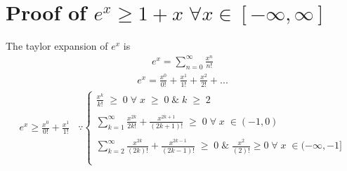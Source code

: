 \documentclass[11pt]{article}
\begin{document}
\section{Proof of $e^x \ge 1 + x \;\forall x \in [-\infty, \infty]$ } \label{appendix: ex}

The taylor expansion of $e^x$ is
\begin{align*}
	e^x = \sum_{n = 0}^{\infty} \frac{x^n}{n!}
\end{align*}
\begin{align*}
	e^x = \frac{x^0}{0!} + \frac{x^1}{1!} + \frac{x^2}{2!} + ... 
\end{align*} 
\begin{align*}
	e^x \ge \frac{x^0}{0!} + \frac{x^1}{1!}  \;\;\;\because
	\begin{cases}
			\frac{x^k}{k!} \;\ge\; 0 \;\forall\;x \; \ge \;0 \;\& \; k\; \ge\; 2\; \\ \\
		\sum_{k = 1}^{\infty}\frac{x^{2k}}{2k!} + \frac{x^{2k+1}}{(2k+1)!}\; \ge \; 0 \; \forall \; x \; \in (-1, 0) \\ \\ 
		\sum_{k = 2}^{\infty}\frac{x^{2k}}{(2k)!} + \frac{x^{2k-1}}{(2k-1)!}\; \ge \; 0 \;\&\; \frac{x^{2}}{(2)!} \ge 0\; \forall \; x \; \in (-\infty, -1] \\ \\
	  \end{cases}    
\end{align*}
		

\end{document}
